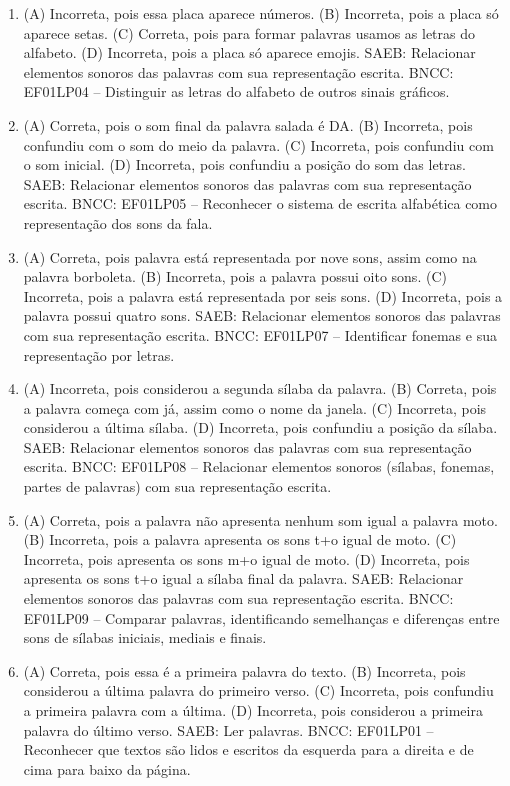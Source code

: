 \begin{enumerate}
\item
(A) Incorreta, pois essa placa aparece números.
(B) Incorreta, pois a placa só aparece setas.
(C) Correta, pois para formar palavras usamos as letras do alfabeto.
(D) Incorreta, pois a placa só aparece emojis.
SAEB: Relacionar elementos sonoros das palavras com sua representação escrita.
BNCC: EF01LP04 -- Distinguir as letras do alfabeto de outros sinais gráficos.

\item
(A) Correta, pois o som final da palavra salada é DA.
(B) Incorreta, pois confundiu com o som do meio da palavra.
(C) Incorreta, pois confundiu com o som inicial.
(D) Incorreta, pois confundiu a posição do som das letras.
SAEB: Relacionar elementos sonoros das palavras com sua representação escrita.
BNCC: EF01LP05 -- Reconhecer o sistema de escrita alfabética como representação dos sons da fala.

\item
(A) Correta, pois palavra está representada por nove sons, assim como na
palavra borboleta.
(B) Incorreta, pois a palavra possui oito sons.
(C) Incorreta, pois a palavra está representada por seis sons.
(D) Incorreta, pois a palavra possui quatro sons.
SAEB: Relacionar elementos sonoros das palavras com sua representação escrita.
BNCC: EF01LP07 -- Identificar fonemas e sua representação por letras.

\item
(A) Incorreta, pois considerou a segunda sílaba da palavra.
(B) Correta, pois a palavra começa com já, assim como o nome da janela.
(C) Incorreta, pois considerou a última sílaba.
(D) Incorreta, pois confundiu a posição da sílaba.
SAEB: Relacionar elementos sonoros das palavras com sua representação escrita.
BNCC: EF01LP08 -- Relacionar elementos sonoros (sílabas, fonemas, partes de palavras) com sua representação escrita.

\item
(A) Correta, pois a palavra não apresenta nenhum som igual a palavra moto.
(B) Incorreta, pois a palavra apresenta os sons t+o igual de moto.
(C) Incorreta, pois apresenta os sons m+o igual de moto.
(D) Incorreta, pois apresenta os sons t+o igual a sílaba final da palavra.
SAEB: Relacionar elementos sonoros das palavras com sua representação escrita.
BNCC: EF01LP09 -- Comparar palavras, identificando semelhanças e diferenças entre sons de sílabas iniciais, mediais e finais.

\item
(A) Correta, pois essa é a primeira palavra do texto.
(B) Incorreta, pois considerou a última palavra do primeiro verso.
(C) Incorreta, pois confundiu a primeira palavra com a última.
(D) Incorreta, pois considerou a primeira palavra do último verso.
SAEB: Ler palavras.
BNCC: EF01LP01 -- Reconhecer que textos são lidos e escritos da esquerda para a
direita e de cima para baixo da página.


\end{enumerate}

